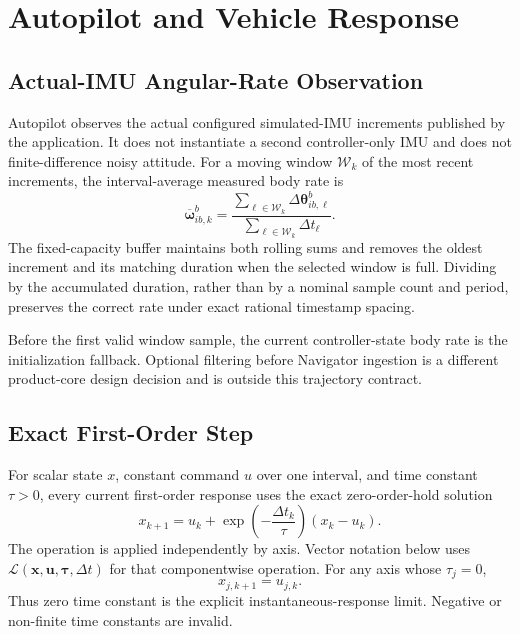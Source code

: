 \chapter{Autopilot and Vehicle Response}

\section{Actual-IMU Angular-Rate Observation}

Autopilot observes the actual configured simulated-IMU increments published by
the application. It does not instantiate a second controller-only IMU and does
not finite-difference noisy attitude. For a moving window $\mathcal{W}_k$ of
the most recent increments, the interval-average measured body rate is
\begin{equation}
\overline{\boldsymbol{\omega}}_{ib,k}^{b}
=
\frac{
  \displaystyle\sum_{\ell\in\mathcal{W}_k}
  \Delta\boldsymbol{\theta}_{ib,\ell}^{b}
}{
  \displaystyle\sum_{\ell\in\mathcal{W}_k}
  \Delta t_{\ell}
}.
\label{eq:imu_moving_average_rate}
\end{equation}
The fixed-capacity buffer maintains both rolling sums and removes the oldest
increment and its matching duration when the selected window is full. Dividing
by the accumulated duration, rather than by a nominal sample count and period,
preserves the correct rate under exact rational timestamp spacing.

Before the first valid window sample, the current controller-state body rate is
the initialization fallback. Optional filtering before Navigator ingestion is
a different product-core design decision and is outside this trajectory
contract.

\section{Exact First-Order Step}

For scalar state $x$, constant command $u$ over one interval, and time
constant $\tau>0$, every current first-order response uses the exact
zero-order-hold solution
\begin{equation}
x_{k+1}
=u_k+\exp\!\left(-\frac{\Delta t_k}{\tau}\right)(x_k-u_k).
\label{eq:first_order_exact}
\end{equation}
The operation is applied independently by axis. Vector notation below uses
$\mathcal{L}(\mathbf{x},\mathbf{u},\boldsymbol{\tau},\Delta t)$ for that
componentwise operation. For any axis whose $\tau_j=0$,
\begin{equation}
x_{j,k+1}=u_{j,k}.
\label{eq:zero_tau}
\end{equation}
Thus zero time constant is the explicit instantaneous-response limit.
Negative or non-finite time constants are invalid.


